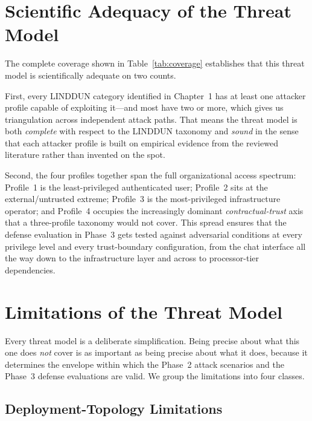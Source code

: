 \documentclass[12pt, a4paper]{report}
\begin{document}
\section{Scientific Adequacy of the Threat Model}

The complete coverage shown in Table~\ref{tab:coverage} establishes that
this threat model is scientifically adequate on two counts.

First, every LINDDUN category identified in Chapter~1 has at least one
attacker profile capable of exploiting it---and most have two or more,
which gives us triangulation across independent attack paths. That means
the threat model is both \emph{complete} with respect to the LINDDUN
taxonomy and \emph{sound} in the sense that each attacker profile is
built on empirical evidence from the reviewed literature rather than
invented on the spot.

Second, the four profiles together span the full organizational access
spectrum: Profile~1 is the least-privileged authenticated user; Profile~2
sits at the external/untrusted extreme; Profile~3 is the most-privileged
infrastructure operator; and Profile~4 occupies the increasingly dominant
\emph{contractual-trust} axis that a three-profile taxonomy would not
cover. This spread ensures that the defense evaluation in Phase~3 gets
tested against adversarial conditions at every privilege level and every
trust-boundary configuration, from the chat interface all the way down to
the infrastructure layer and across to processor-tier dependencies.

\section{Limitations of the Threat Model}
\label{sec:limitations}

Every threat model is a deliberate simplification. Being precise about
what this one does \emph{not} cover is as important as being precise
about what it does, because it determines the envelope within which the
Phase~2 attack scenarios and the Phase~3 defense evaluations are valid.
We group the limitations into four classes.

\subsection{Deployment-Topology Limitations}
\end{document}
